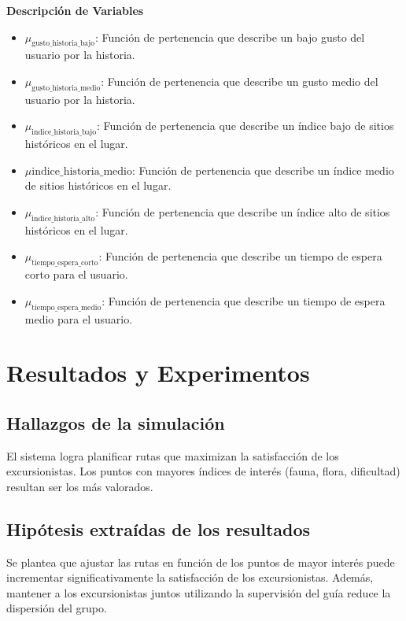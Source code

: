 \documentclass[10pt,twocolumn]{article}
\begin{document}
	
	
	\textbf{Descripción de Variables}
	\begin{itemize}
		\item \(\mu_{\text{gusto\_historia\_bajo}}\): Función de pertenencia que describe un bajo gusto del usuario por la historia.
		\item \(\mu_{\text{gusto\_historia\_medio}}\): Función de pertenencia que describe un gusto medio del usuario por la historia.
		\item \(\mu_{\text{indice\_historia\_bajo}}\): Función de pertenencia que describe un índice bajo de sitios históricos en el lugar.
		\item \(\mu{\text{indice\_historia\_medio}}\): Función de pertenencia que describe un índice medio de sitios históricos en el lugar.
		\item \(\mu_{\text{indice\_historia\_alto}}\): Función de pertenencia que describe un índice alto de sitios históricos en el lugar.
		\item \(\mu_{\text{tiempo\_espera\_corto}}\): Función de pertenencia que describe un tiempo de espera corto para el usuario.
		\item \(\mu_{\text{tiempo\_espera\_medio}}\): Función de pertenencia que describe un tiempo de espera medio para el usuario.
	\end{itemize}
	
	\section{Resultados y Experimentos}
	
	\subsection{Hallazgos de la simulación}
	El sistema logra planificar rutas que maximizan la satisfacción de los excursionistas. Los puntos con mayores índices de interés (fauna, flora, dificultad) resultan ser los más valorados.
	
	\subsection{Hipótesis extraídas de los resultados}
	Se plantea que ajustar las rutas en función de los puntos de mayor interés puede incrementar significativamente la satisfacción de los excursionistas. Además, mantener a los excursionistas juntos utilizando la supervisión del guía reduce la dispersión del grupo.
	
\end{document}
